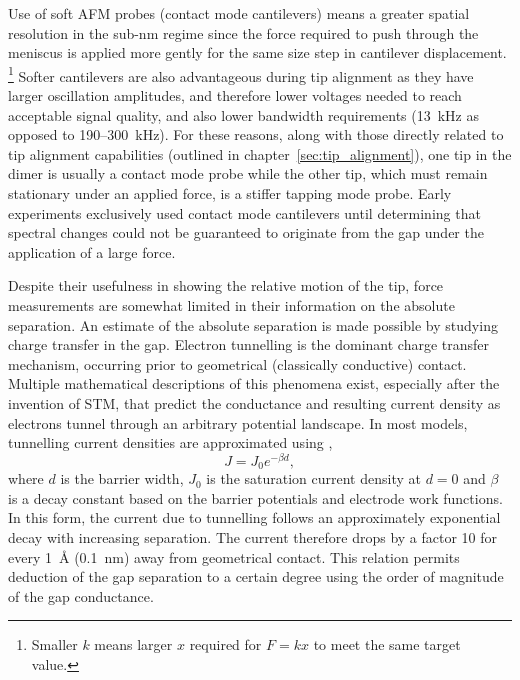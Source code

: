 \documentclass[a4paper]{article}
\begin{document}
Use of soft AFM probes (contact mode cantilevers) means a greater spatial resolution in the sub-nm regime since the force required to push through the meniscus is applied more gently for the same size step in cantilever displacement.%
\footnote{Smaller $k$ means larger $x$ required for $F=kx$ to meet the same target value.}
Softer cantilevers are also advantageous during tip alignment as they have larger oscillation amplitudes, and therefore lower voltages needed to reach acceptable signal quality, and also lower bandwidth requirements (\SI{13}{kHz} as opposed to 190--\SI{300}{kHz}).
For these reasons, along with those directly related to tip alignment capabilities (outlined in chapter~\ref{sec:tip_alignment}), one tip in the dimer is usually a contact mode probe while the other tip, which must remain stationary under an applied force, is a stiffer tapping mode probe. Early experiments exclusively used contact mode cantilevers until determining that spectral changes could not be guaranteed to originate from the gap under the application of a large force.

Despite their usefulness in showing the relative motion of the tip, force measurements are somewhat limited in their information on the absolute separation. An estimate of the absolute separation is made possible by studying charge transfer in the gap.
Electron tunnelling is the dominant charge transfer mechanism, occurring prior to geometrical (classically conductive) contact. Multiple mathematical descriptions of this phenomena exist\cite{simmons1963generalized, blanco2006stm}, especially after the invention of STM, that predict the conductance and resulting current density as electrons tunnel through an arbitrary potential landscape. In most models, tunnelling current densities are approximated using \cite{tan2014},
\begin{equation} J=J_0e^{-\beta d}, \end{equation}
where $d$ is the barrier width, $J_0$ is the saturation current density at $d=0$ and $\beta$ is a decay constant based on the barrier potentials and electrode work functions. In this form, the current due to tunnelling follows an approximately exponential decay with increasing separation. The current therefore drops by a factor 10 for every \SI{1}{\angstrom} (\SI{0.1}{nm}) away from geometrical contact. This relation permits deduction of the gap separation to a certain degree using the order of magnitude of the gap conductance.
\end{document}
